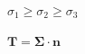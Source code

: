 \documentclass{article}
\begin{document}
$ \sigma_1 \ge \sigma_2 \ge \sigma_3 $
\pagebreak

$ \mathbf{T} = \mathbf{\Sigma} \cdot \mathbf{n} $
\pagebreak
\end{document}
